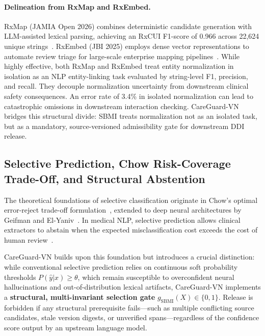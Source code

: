 \documentclass[11pt]{article}
\begin{document}
\paragraph{Delineation from RxMap and RxEmbed.}
RxMap (JAMIA Open 2026) combines deterministic candidate generation with LLM-assisted lexical parsing, achieving an RxCUI F1-score of 0.966 across 22,624 unique strings~\cite{korpela2026rxmap}. RxEmbed (JBI 2025) employs dense vector representations to automate review triage for large-scale enterprise mapping pipelines~\cite{huser2025rxembed}. While highly effective, both RxMap and RxEmbed treat entity normalization in isolation as an NLP entity-linking task evaluated by string-level F1, precision, and recall. They decouple normalization uncertainty from downstream clinical safety consequences. An error rate of 3.4\% in isolated normalization can lead to catastrophic omissions in downstream interaction checking. CareGuard-VN bridges this structural divide: SBMI treats normalization not as an isolated task, but as a mandatory, source-versioned admissibility gate for downstream DDI release.

\subsection{Selective Prediction, Chow Risk-Coverage Trade-Off, and Structural Abstention}
The theoretical foundations of selective classification originate in Chow's optimal error-reject trade-off formulation~\cite{chow1970}, extended to deep neural architectures by Geifman and El-Yaniv~\cite{geifman2017selective}. In medical NLP, selective prediction allows clinical extractors to abstain when the expected misclassification cost exceeds the cost of human review~\cite{swaminathan2024selective}. 

CareGuard-VN builds upon this foundation but introduces a crucial distinction: while conventional selective prediction relies on continuous soft probability thresholds $P(\hat{y}|x) \ge \theta$, which remain susceptible to overconfident neural hallucinations and out-of-distribution lexical artifacts, CareGuard-VN implements a \textbf{structural, multi-invariant selection gate} $g_{\text{SBMI}}(X) \in \{0, 1\}$. Release is forbidden if any structural prerequisite fails---such as multiple conflicting source candidates, stale version digests, or unverified spans---regardless of the confidence score output by an upstream language model.
\end{document}
